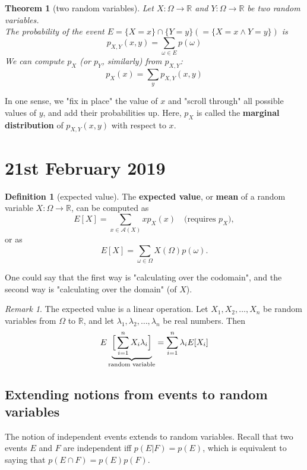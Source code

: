 \documentclass{article}
\theoremstyle{plain}
\newtheorem{thm}{Theorem}
\theoremstyle{definition}
\newtheorem{defn}{Definition}
\theoremstyle{remark}
\newtheorem*{remark}{Remark}
\begin{document}
\begin{thm}[two random variables]
Let $X: \Omega \to \mathbb{R}$ and $Y: \Omega \to \mathbb{R}$ be two random variables. \\
The probability of the event $E = \{X = x\} \cap \{Y = y\}(= \{X = x \land Y = y\})$ is
\begin{equation}
	p_{X, Y}(x, y) = \sum_{\omega \in E} p(\omega)
\end{equation}
We can compute $p_X$ (or $p_Y$, similarly) from $p_{X, Y}$:
\begin{equation}
	p_X(x) = \sum_y p_{X, Y}(x, y)
\end{equation}
\end{thm}
In one sense, we "fix in place" the value of $x$ and "scroll through" all possible values of $y$, and add their probabilities up. Here, $p_X$ is called the \textbf{marginal distribution} of $p_{X, Y}(x, y)$ with respect to $x$.

\section{21st February 2019}

\begin{defn}[expected value]
The \textbf{expected value}, or \textbf{mean} of a random variable $X: \Omega \to \mathbb{R}$, can be computed as
\begin{equation}
	E[X] = \sum_{x \in \mathcal A(X)} x p_X(x) \quad \text{(requires $p_X$)},
\end{equation}
or as
\begin{equation}
	E[X] = \sum_{\omega \in \Omega} X(\Omega) p(\omega).
\end{equation}
\end{defn}
One could say that the first way is "calculating over the codomain", and the second way is "calculating over the domain" (of $X$). 

\begin{remark} The expected value is a linear operation. Let $X_1, X_2, \dots, X_n$ be random variables from $\Omega$ to $\mathbb{R}$, and let $\lambda_1, \lambda_2, \dots, \lambda_n$ be real numbers. Then
\begin{equation}
	E\underbrace{\Bigr[\sum_{i=1}^n X_i\lambda_i\Bigl]}_{\text{random variable}} = \sum_{i=1}^n \lambda_i E[X_i]
\end{equation}
\end{remark}

\subsection{Extending notions from events to random variables}
The notion of independent events extends to random variables. Recall that two events $E$ and $F$ are independent iff $p(E|F) = p(E)$, which is equivalent to saying that $p(E \cap F) = p(E)p(F)$. 
\end{document}
